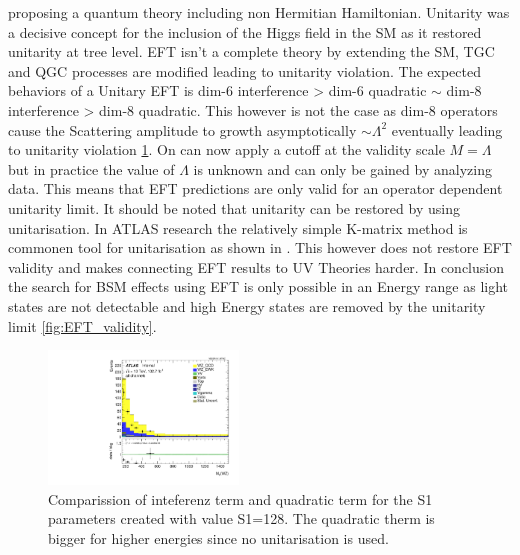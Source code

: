 \documentclass[../Bachelorarbeit.tex]{subfiles}
\begin{document}
proposing a quantum theory including non Hermitian Hamiltonian. Unitarity was a decisive concept for the inclusion of the Higgs field in the SM as it restored unitarity at tree level.
EFT isn't a complete theory by extending the SM, TGC and QGC processes are modified leading to unitarity violation. The expected behaviors of a Unitary EFT is dim-6 interference > dim-6 quadratic $\sim$ dim-8 interference > dim-8 quadratic.
This however is not the case as dim-8 operators cause the Scattering amplitude to growth asymptotically $\sim \Lambda^{2}$ eventually leading to unitarity violation \ref{fig:dim8_quad_int_comparission}.
On can now apply a cutoff at the validity scale $M=\Lambda$ but in practice the value of $\Lambda$ is unknown and can only be gained by analyzing data. This means that EFT predictions are only valid for an operator dependent unitarity limit.
It should be noted that unitarity can be restored by using unitarisation. In ATLAS research the relatively simple K-matrix method is commonen tool for unitarisation as shown in \cite{Kilian.2015}. This however does not restore EFT validity and
makes connecting EFT results to UV Theories harder. In conclusion the search for BSM effects using EFT is only possible in an Energy range as light states are not detectable and high Energy states are removed by the unitarity limit \ref{fig:EFT_validity}.
\begin{figure}[h]
    \centering
    \centering
    \includegraphics[width=0.45\textwidth]{Plots/Sm_re/all_VV_MTWZ.pdf}
    \caption{Comparission of inteferenz term and quadratic term for the S1 parameters created with value S1=128. The quadratic therm is bigger for higher energies since no unitarisation is used.}
    \label{fig:dim8_quad_int_comparission}
\end{figure}
\end{document}
